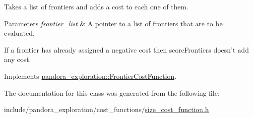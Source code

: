 \-Takes a list of frontiers and adds a cost to each one of them. 


\begin{DoxyParams}{\-Parameters}
{\em frontier\-\_\-list} & \-A pointer to a list of frontiers that are to be evaluated.\\
\hline
\end{DoxyParams}
\-If a frontier has already assigned a negative cost then score\-Frontiers doesn't add any cost. 

\-Implements \hyperlink{classpandora__exploration_1_1_frontier_cost_function_a1049bc25e934365fdf3a1a6ab88c4cca}{pandora\-\_\-exploration\-::\-Frontier\-Cost\-Function}.



\-The documentation for this class was generated from the following file\-:\begin{DoxyCompactItemize}
\item 
include/pandora\-\_\-exploration/cost\-\_\-functions/\hyperlink{size__cost__function_8h}{size\-\_\-cost\-\_\-function.\-h}\end{DoxyCompactItemize}
